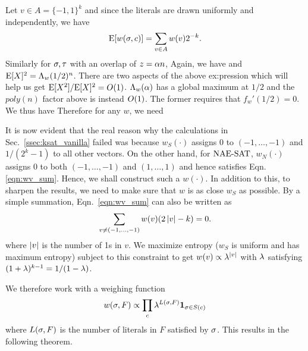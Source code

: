 \documentclass[letterpaper, 10pt, twocolumn, reqno]{amsart}
\begin{document}
Let $v \in A = \{-1,1\}^k$ and since the literals are drawn uniformly and independently, we have
$$
\textrm{E}[w(\sigma,c)] = \sum_{v \in A} w(v) 2^{-k}.
$$
Similarly for $\sigma, \tau$ with an overlap of $z =\alpha n$,
Again, we have
and $\textrm{E}[X]^2 = \Lambda_w(1/2)^n$. There are two aspects of the above ex:pression which will help us get $\textrm{E}[X^2]/\textrm{E}[X]^2 = O(1)$. $\Lambda_w(\alpha)$ has a global maximum at $1/2$ and the $poly(n)$ factor above is instead $O(1)$. The former requires that $f_w'(1/2) =0$. We thus have
Therefore for any $w$, we need

It is now evident that the real reason why the calculations in Sec.~\ref{ssec:ksat_vanilla} failed was because $w_S(\cdot)$ assigns 0 to $(-1,\ldots,-1)$
and $1/(2^k-1)$ to all other vectors. On the other hand, for $\textrm{NAE-SAT}$, $w_N(\cdot)$ assigns 0 to both $(-1,\ldots,-1)$ and $(1,\ldots,1)$ and hence satisfies Eqn.~
\eqref{eqn:wv_sum}. Hence, we shall construct such a $w(\cdot)$. In addition to this, to sharpen the results, we need to make sure that $w$ is as close $w_S
$ as possible. By a simple summation, Eqn.~\eqref{eqn:wv_sum} can also be written as
$$
\sum_{v \neq (-1,\ldots,-1)} w(v) (2\left| v \right| - k) = 0.
$$
where $\left| v \right|$ is the number of 1s in $v$. We maximize entropy ($w_S$ is uniform and has maximum entropy) subject to this constraint to get $w(v) \propto \lambda^{\left| v \right|}$ with $\lambda$ satisfying $(1+\lambda)^{k-1} = 1/(1-\lambda)$.

We therefore work with a weighing function
$$
w(\sigma,F) \propto \prod_c \lambda^{L(\sigma,F)} {\bf 1}_{\sigma \in S(c)}
$$
where $L(\sigma,F)$ is the number of literals in $F$ satisfied by $\sigma$. This results in the following theorem.
\end{document}
